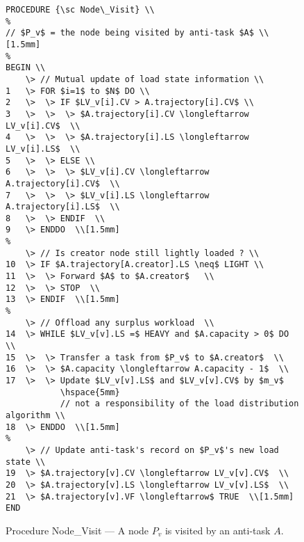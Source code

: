 \begin{figure}[p]
\begin{verbatim}
PROCEDURE {\sc Node\_Visit} \\
%
// $P_v$ = the node being visited by anti-task $A$ \\[1.5mm]
%
BEGIN \\
	\> // Mutual update of load state information \\
1	\> FOR $i=1$ to $N$ DO \\
2	\> 	\> IF $LV_v[i].CV > A.trajectory[i].CV$ \\
3	\>	\>	\> $A.trajectory[i].CV \longleftarrow LV_v[i].CV$  \\
4	\>	\>	\> $A.trajectory[i].LS \longleftarrow LV_v[i].LS$  \\
5	\>	\> ELSE \\
6	\>	\>	\> $LV_v[i].CV \longleftarrow A.trajectory[i].CV$  \\
7	\>	\>	\> $LV_v[i].LS \longleftarrow A.trajectory[i].LS$  \\
8	\>	\> ENDIF  \\
9	\> ENDDO  \\[1.5mm]
%
	\> // Is creator node still lightly loaded ? \\
10	\> IF $A.trajectory[A.creator].LS \neq$ LIGHT \\
11	\>	\> Forward $A$ to $A.creator$   \\
12	\>	\> STOP  \\
13	\> ENDIF  \\[1.5mm]
%
	\> // Offload any surplus workload  \\
14	\> WHILE $LV_v[v].LS =$ HEAVY and $A.capacity > 0$ DO \\
15	\>	\> Transfer a task from $P_v$ to $A.creator$  \\
16	\>	\> $A.capacity \longleftarrow A.capacity - 1$  \\
17	\> 	\> Update $LV_v[v].LS$ and $LV_v[v].CV$ by $m_v$  
		   \hspace{5mm} 
		   // not a responsibility of the load distribution algorithm \\
18	\> ENDDO  \\[1.5mm]
%
	\> // Update anti-task's record on $P_v$'s new load state \\
19	\> $A.trajectory[v].CV \longleftarrow LV_v[v].CV$  \\
20	\> $A.trajectory[v].LS \longleftarrow LV_v[v].LS$  \\
21	\> $A.trajectory[v].VF \longleftarrow$ TRUE  \\[1.5mm]
END
\end{verbatim}
\caption {Procedure {\sc Node\_Visit} --- A node $P_v$ is visited by an anti-task $A$.}
\label{fig:anti.basic.procedure_node_visit}
\end{figure}


